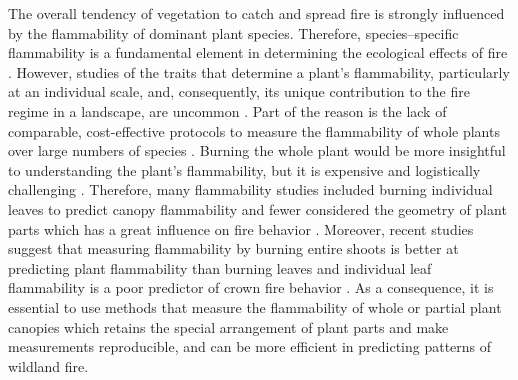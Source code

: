 \documentclass{ttuthes2007}
\begin{document}
\noindent The overall tendency of vegetation to catch and spread fire is strongly influenced by the flammability of dominant plant species. Therefore, species--specific flammability is a fundamental element in determining the ecological effects of fire \citep{bond1995kill, lavorel2002predicting, bond2005fire, wyse2018shoot}. However, studies of the traits that determine a plant's flammability, particularly at an individual scale, and, consequently, its unique contribution to the fire regime in a landscape, are uncommon \citep{jaureguiberry2011device, schwilk2015dimensions, pausas2017flammability}. Part of the reason is the lack of comparable, cost-effective protocols to measure the flammability of whole plants over large numbers of species \citep{jaureguiberry2011device}. Burning the whole plant would be more insightful to understanding the plant's flammability, but it is expensive and logistically challenging \citep{jaureguiberry2011device, pausasandmoi2012flammability}. Therefore, many flammability studies included burning individual leaves to predict canopy flammability and fewer considered the geometry of plant parts which has a great influence on fire behavior \citep{schwilk2003flammability, madrigal2012evaluation, pausas2012firesulex, calitz2015investigating, gao2018grass}. Moreover, recent studies suggest that measuring flammability by burning entire shoots is better at predicting plant flammability than burning leaves \citep{alam2020shoot} and individual leaf flammability is a poor predictor of crown fire behavior \citep{fernandes2012plant}. As a consequence, it is essential to use methods that measure the flammability of whole or partial plant canopies which retains the special arrangement of plant parts and make measurements reproducible, and can be more efficient in predicting %
patterns of wildland fire.



\end{document}
